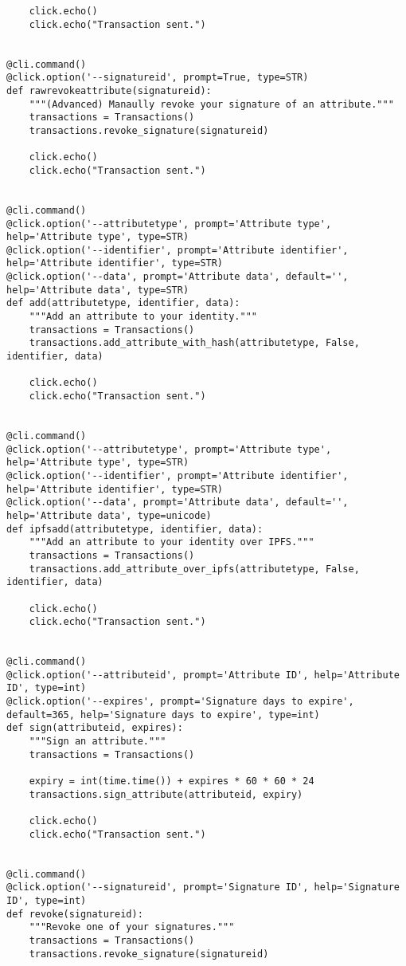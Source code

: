 \documentclass[12pt]{report}
\begin{document}
\begin{lstlisting}
    click.echo()
    click.echo("Transaction sent.")


@cli.command()
@click.option('--signatureid', prompt=True, type=STR)
def rawrevokeattribute(signatureid):
    """(Advanced) Manaully revoke your signature of an attribute."""
    transactions = Transactions()
    transactions.revoke_signature(signatureid)

    click.echo()
    click.echo("Transaction sent.")


@cli.command()
@click.option('--attributetype', prompt='Attribute type', help='Attribute type', type=STR)
@click.option('--identifier', prompt='Attribute identifier', help='Attribute identifier', type=STR)
@click.option('--data', prompt='Attribute data', default='', help='Attribute data', type=STR)
def add(attributetype, identifier, data):
    """Add an attribute to your identity."""
    transactions = Transactions()
    transactions.add_attribute_with_hash(attributetype, False, identifier, data)

    click.echo()
    click.echo("Transaction sent.")


@cli.command()
@click.option('--attributetype', prompt='Attribute type', help='Attribute type', type=STR)
@click.option('--identifier', prompt='Attribute identifier', help='Attribute identifier', type=STR)
@click.option('--data', prompt='Attribute data', default='', help='Attribute data', type=unicode)
def ipfsadd(attributetype, identifier, data):
    """Add an attribute to your identity over IPFS."""
    transactions = Transactions()
    transactions.add_attribute_over_ipfs(attributetype, False, identifier, data)

    click.echo()
    click.echo("Transaction sent.")


@cli.command()
@click.option('--attributeid', prompt='Attribute ID', help='Attribute ID', type=int)
@click.option('--expires', prompt='Signature days to expire', default=365, help='Signature days to expire', type=int)
def sign(attributeid, expires):
    """Sign an attribute."""
    transactions = Transactions()

    expiry = int(time.time()) + expires * 60 * 60 * 24
    transactions.sign_attribute(attributeid, expiry)

    click.echo()
    click.echo("Transaction sent.")


@cli.command()
@click.option('--signatureid', prompt='Signature ID', help='Signature ID', type=int)
def revoke(signatureid):
    """Revoke one of your signatures."""
    transactions = Transactions()
    transactions.revoke_signature(signatureid)


\end{lstlisting}
\end{document}
